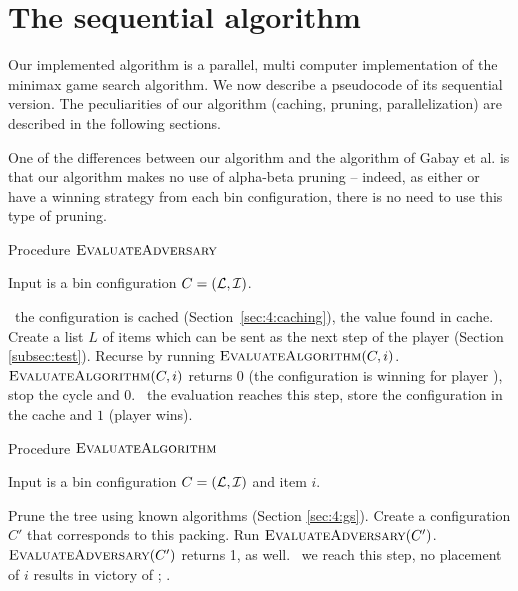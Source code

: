 \section{The sequential algorithm}\label{sec:minimax}

Our implemented algorithm is a parallel, multi computer implementation
of the minimax game search algorithm. We now describe a pseudocode of
its sequential version. The peculiarities of our algorithm (caching,
pruning, parallelization) are described in the following sections.

One of the differences between our algorithm and the algorithm of
Gabay et al. \cite{gabay2013lbv2} is that our algorithm makes no use
of alpha-beta pruning -- indeed, as either \algo or \adversary have a
winning strategy from each bin configuration, there is no need to use
this type of pruning.

\begin{algorithm}
\caption{Procedure $\textsc{EvaluateAdversary}$}
Input is a bin configuration $C = ({\mathcal L}, {\mathcal I})$.
\begin{algorithmic}[1]
\State \algorithmicif\ the configuration is cached (Section~\ref{sec:4:caching}), \Return the value found in cache.
\State Create a list $L$ of items which can be sent as the next step of the player \adversary (Section \ref{subsec:test}).
\State Recurse by running $\textsc{EvaluateAlgorithm}(C,i)$.
\State \algorithmicif\ $\textsc{EvaluateAlgorithm}(C,i)$ returns $0$ (the configuration is winning for player \adversary), stop the cycle and \Return $0$.
\EndFor
\State \algorithmicif\ the evaluation reaches this step, store the configuration in the cache and \Return $1$ (player \algo wins).

\end{algorithmic}
\end{algorithm}


\begin{algorithm}
\caption{Procedure $\textsc{EvaluateAlgorithm}$}
Input is a bin configuration $C = ({\mathcal L},{\mathcal I})$ and item $i$.
\begin{algorithmic}[1]
\State Prune the tree using known algorithms (Section \ref{sec:4:gs}).
\State Create a configuration $C'$ that corresponds to this packing.
\State Run $\textsc{EvaluateAdversary}(C')$.
\State \algorithmicif\ $\textsc{EvaluateAdversary}(C')$ returns 1,  as well.
\EndIf
\EndFor
\State \algorithmicif\ we reach this step, no placement of $i$ results in victory of \algo; .
\end{algorithmic}
\end{algorithm}

